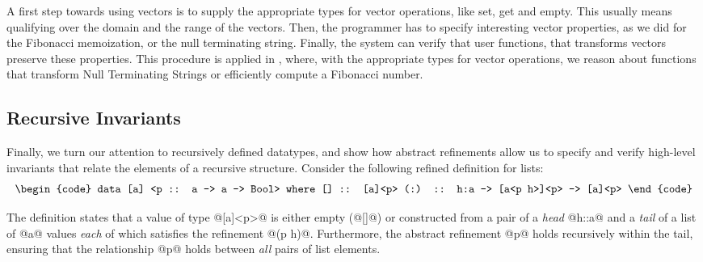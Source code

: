 A first step towards using vectors is 
to supply the appropriate types 
for vector operations, like 
set, get and empty.
This usually means qualifying
over the domain and the range of the vectors. 
%
Then, the programmer has to specify interesting vector properties, 
as we did for the Fibonacci memoization, or the null terminating string.
% 
Finally, the system can verify that user functions, that transforms vectors
preserve these properties.
%
This procedure is applied in \cite{Vazou13},
where, with the appropriate types for vector operations,
we reason about functions that transform Null Terminating Strings
or efficiently compute a Fibonacci number.
%


\subsection{Recursive Invariants}
Finally, we turn our attention to recursively defined datatypes, and show 
how abstract refinements allow us to specify and verify high-level
invariants that relate the elements of a recursive structure.
Consider the following refined definition for lists:
%
$$\centering\begin{tabular}{c}\begin{code}
data [a] <p :: a -> a -> Bool> where
  []  :: [a]<p>
  (:) :: h:a -> [a<p h>]<p> -> [a]<p>
\end{code}\end{tabular}$$

The definition states that a value of type @[a]<p>@ 
is either empty (@[]@) or constructed from a pair of  
a \emph{head} @h::a@ and a \emph{tail} of a list of 
@a@ values \emph{each} of which satisfies the refinement @(p h)@. 
Furthermore, the abstract refinement @p@ holds recursively
within the tail, ensuring that the relationship @p@ 
holds between \emph{all} pairs of list elements.


